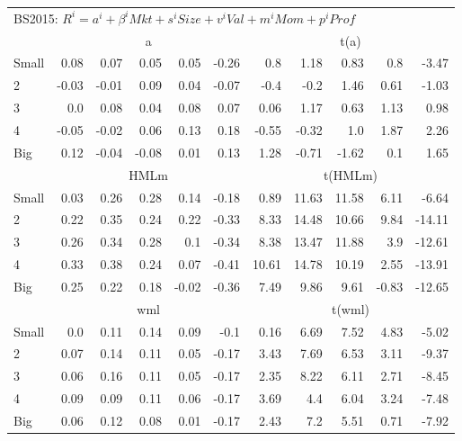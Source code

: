 \begin{table}[!ht]
\begin{tabular}{lrrrrrrrrrr}
  \midrule
  \multicolumn{9}{l}{BS2015: $R^i=a^i+\beta^iMkt+s^iSize+v^iVal+m^iMom+p^iProf$} \\

      & \multicolumn{5}{c}{a} & \multicolumn{5}{c}{t(a)} \\
    \cmidrule(r){2-6} \cmidrule(r){7-11}
      Small  & 0.08  & 0.07  & 0.05  & 0.05  & -0.26   & 0.8  & 1.18  & 0.83  & 0.8  & -3.47  \\
          2  & -0.03  & -0.01  & 0.09  & 0.04  & -0.07   & -0.4  & -0.2  & 1.46  & 0.61  & -1.03  \\
          3  & 0.0  & 0.08  & 0.04  & 0.08  & 0.07   & 0.06  & 1.17  & 0.63  & 1.13  & 0.98  \\
          4  & -0.05  & -0.02  & 0.06  & 0.13  & 0.18   & -0.55  & -0.32  & 1.0  & 1.87  & 2.26  \\
      Big    & 0.12  & -0.04  & -0.08  & 0.01  & 0.13   & 1.28  & -0.71  & -1.62  & 0.1  & 1.65  \\

      & \multicolumn{5}{c}{HMLm} & \multicolumn{5}{c}{t(HMLm)} \\
    \cmidrule(r){2-6} \cmidrule(r){7-11}
      Small  & 0.03  & 0.26  & 0.28  & 0.14  & -0.18   & 0.89  & 11.63  & 11.58  & 6.11  & -6.64  \\
          2  & 0.22  & 0.35  & 0.24  & 0.22  & -0.33   & 8.33  & 14.48  & 10.66  & 9.84  & -14.11  \\
          3  & 0.26  & 0.34  & 0.28  & 0.1  & -0.34   & 8.38  & 13.47  & 11.88  & 3.9  & -12.61  \\
          4  & 0.33  & 0.38  & 0.24  & 0.07  & -0.41   & 10.61  & 14.78  & 10.19  & 2.55  & -13.91  \\
      Big    & 0.25  & 0.22  & 0.18  & -0.02  & -0.36   & 7.49  & 9.86  & 9.61  & -0.83  & -12.65  \\

      & \multicolumn{5}{c}{wml} & \multicolumn{5}{c}{t(wml)} \\
    \cmidrule(r){2-6} \cmidrule(r){7-11}
      Small  & 0.0  & 0.11  & 0.14  & 0.09  & -0.1   & 0.16  & 6.69  & 7.52  & 4.83  & -5.02  \\
          2  & 0.07  & 0.14  & 0.11  & 0.05  & -0.17   & 3.43  & 7.69  & 6.53  & 3.11  & -9.37  \\
          3  & 0.06  & 0.16  & 0.11  & 0.05  & -0.17   & 2.35  & 8.22  & 6.11  & 2.71  & -8.45  \\
          4  & 0.09  & 0.09  & 0.11  & 0.06  & -0.17   & 3.69  & 4.4  & 6.04  & 3.24  & -7.48  \\
      Big    & 0.06  & 0.12  & 0.08  & 0.01  & -0.17   & 2.43  & 7.2  & 5.51  & 0.71  & -7.92  \\
  

  \bottomrule
\end{tabular}
\end{table}